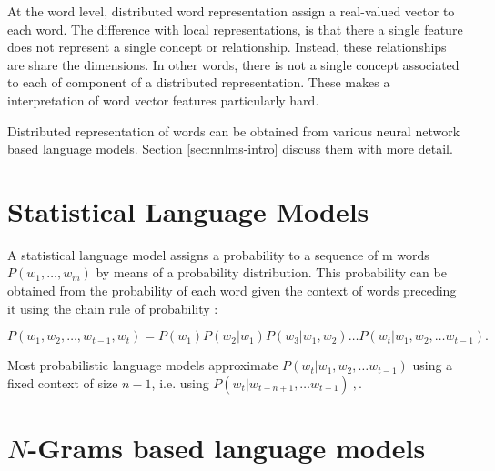 At the word level, distributed word representation assign a real-valued vector
to each word. The difference with local representations, is that there a single
feature does not represent a single concept or relationship. Instead, these
relationships are share the dimensions. In other words, there is not a
single concept associated to each of component of a distributed
representation. These makes a interpretation of word vector features
particularly hard.

Distributed representation of words can be obtained from various neural
network based language models. Section \ref{sec:nnlms-intro} discuss them
with more detail.





\section{Statistical Language Models}
\label{sec:relwork-language-models}

A statistical language model assigns a probability to a sequence of m
words $P(w_1,\ldots,w_m)$ by means of a probability distribution. 
This probability can be obtained from the probability of
each word given the context of words preceding it using the chain rule of probability \cite{Bengio:2008}:

\begin{equation}
\label{eq:lm_probability}
 P(w_1, w_2, \ldots, w_{t-1},w_t) = P(w_1) P(w_2|w_1) P(w_3|w_1,w_2) \ldots 
  P(w_t | w_1, w_2, \ldots w_{t-1}).
\end{equation}

Most probabilistic language models  approximate $P(w_t | w_1, w_2, \ldots
w_{t-1})$ using a fixed context of size $n-1$, i.e. using  $P(w_t | w_{t-n+1}, \ldots w_{t-1})\ ,$.



\section{$N$-Grams based language models}
\label{sec:n-gram-lm}




